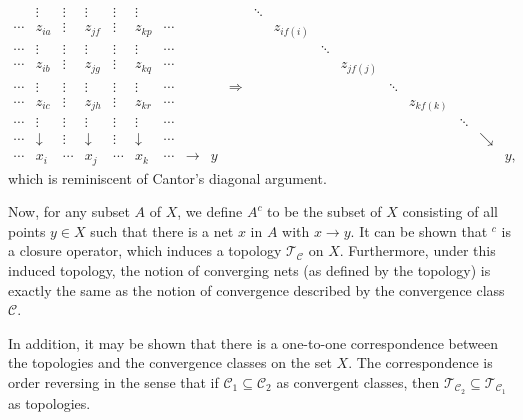 \documentclass[12pt]{article}
\begin{document}
$$
\begin{array}{cccccccccccccccccccc}
       & \vdots     & \vdots  & \vdots     & \vdots  & \vdots     &         &          &   & &               
\ddots &            &         &            &         &            &         &          &   \\
\cdots & z_{ia}     & \vdots  & z_{jf}     & \vdots  & z_{kp}     & \cdots  &          &   & &               
       & z_{if(i)}  &         &            &         &            &         &          &   \\
\cdots & \vdots     & \vdots  & \vdots     & \vdots  & \vdots     & \cdots  &          &   & &               
       &            & \ddots  &            &         &            &         &          &   \\
\cdots & z_{ib}     & \vdots  & z_{jg}     & \vdots  & z_{kq}     & \cdots  &          &   & &               
       &            &         & z_{jf(j)}  &         &            &         &          &   \\
\cdots & \vdots     & \vdots  & \vdots     & \vdots  & \vdots     & \cdots  &          &   & \Rightarrow &
       &            &         &            & \ddots  &            &         &          &   \\
\cdots & z_{ic}     & \vdots  & z_{jh}     & \vdots  & z_{kr}     & \cdots  &          &   & &               
       &            &         &            &         & z_{kf(k)}  &         &          &   \\
\cdots & \vdots     & \vdots  & \vdots     & \vdots  & \vdots     & \cdots  &          &   & &               
       &            &         &            &         &            & \ddots  &          &   \\
\cdots & \downarrow & \vdots  & \downarrow & \vdots  & \downarrow & \cdots  &          &   & &               
       &            &         &            &         &            &         & \searrow &   \\
\cdots & x_i        & \cdots  & x_j        & \cdots  & x_k        & \cdots  & \to      & y & &               
       &            &         &            &         &            &         &          & y, 
\end{array}
$$
which is reminiscent of Cantor's diagonal argument.

Now, for any subset $A$ of $X$, we define $A^c$ to be the subset of $X$ consisting of all points $y\in X$ such that there is a net $x$ in $A$ with $x\to y$.  It can be shown that $^c$ is a closure operator, which induces a topology $\mathcal{T}_{\mathcal{C}}$ on $X$.  Furthermore, under this induced topology, the notion of converging nets (as defined by the topology) is exactly the same as the notion of convergence described by the convergence class $\mathcal{C}$.

In addition, it may be shown that there is a one-to-one correspondence between the topologies and the convergence classes on the set $X$.  The correspondence is order reversing in the sense that if $\mathcal{C}_1\subseteq \mathcal{C}_2$ as convergent classes, then $\mathcal{T}_{\mathcal{C}_2}\subseteq \mathcal{T}_{\mathcal{C}_1}$ as topologies.
\end{document}
